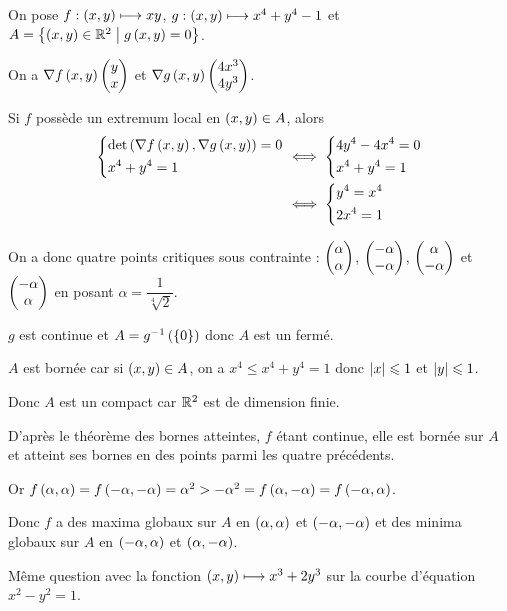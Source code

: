 \begin{corr}
On pose \(f:\left(x,y\right)\longmapsto xy\), \(g:\left(x,y\right)\longmapsto x^4+y^4-1\) et \(A=\left\lbrace\left(x,y\right)\in\mathbb{R}^2\;\middle|\; g\left(x,y\right)=0\right\rbrace\).

On a \(\nabla f\left(x,y\right)\begin{pmatrix}y\\x\end{pmatrix}\) et \(\nabla g\left(x,y\right)\begin{pmatrix}4x^3\\4y^3\end{pmatrix}\).

Si \(f\) possède un extremum local en \(\left(x,y\right)\in A\), alors \[\begin{aligned}
\begin{dcases}
\det\left(\nabla f\left(x,y\right),\nabla g\left(x,y\right)\right)=0 \\
x^4+y^4=1
\end{dcases}&\iff\begin{dcases}
4y^4-4x^4=0 \\
x^4+y^4=1
\end{dcases} \\
&\iff\begin{dcases}
y^4=x^4 \\
2x^4=1
\end{dcases}
\end{aligned}\]

On a donc quatre points critiques sous contrainte : \(\begin{pmatrix}\alpha\\\alpha\end{pmatrix}\), \(\begin{pmatrix}-\alpha\\-\alpha\end{pmatrix}\), \(\begin{pmatrix}\alpha\\-\alpha\end{pmatrix}\) et \(\begin{pmatrix}-\alpha\\\alpha\end{pmatrix}\) en posant \(\alpha=\dfrac{1}{\sqrt[4]{2}}\).

\(g\) est continue et \(A=g^{-1}\left(\left\lbrace0\right\rbrace\right)\) donc \(A\) est un fermé.

\(A\) est bornée car si \(\left(x,y\right)\in A\), on a \(x^4\leq x^4+y^4=1\) donc \(\left\lvert x\right\rvert\leqslant1\) et \(\left\lvert y\right\rvert\leqslant1\).

Donc \(A\) est un compact car \(\mathbb{R}^2\) est de dimension finie.

D'après le théorème des bornes atteintes, \(f\) étant continue, elle est bornée sur \(A\) et atteint ses bornes en des points parmi les quatre précédents.

Or \(f\left(\alpha,\alpha\right)=f\left(-\alpha,-\alpha\right)=\alpha^2>-\alpha^2=f\left(\alpha,-\alpha\right)=f\left(-\alpha,\alpha\right)\).

Donc \(f\) a des maxima globaux sur \(A\) en \(\left(\alpha,\alpha\right)\) et \(\left(-\alpha,-\alpha\right)\) et des minima globaux sur \(A\) en \(\left(-\alpha,\alpha\right)\) et \(\left(\alpha,-\alpha\right)\).
\end{corr}

\begin{exo}
Même question avec la fonction \(\left(x,y\right)\longmapsto x^3+2y^3\) sur la courbe d'équation \(x^2-y^2=1\).
\end{exo}

